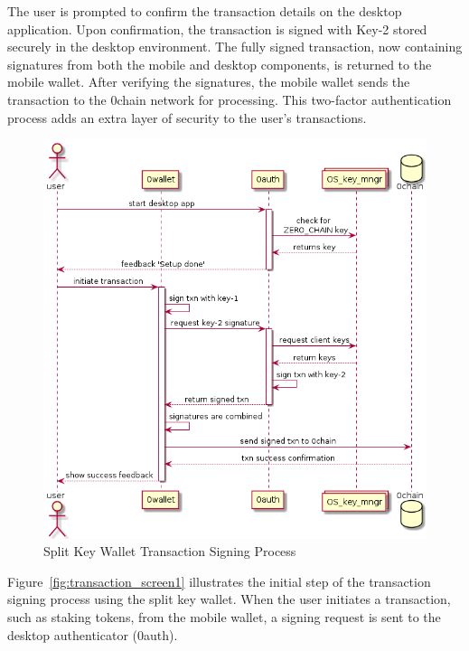 The user is prompted to confirm the transaction details on the desktop application. Upon confirmation, the transaction is signed with Key-2 stored securely in the desktop environment. The fully signed transaction, now containing signatures from both the mobile and desktop components, is returned to the mobile wallet. After verifying the signatures, the mobile wallet sends the transaction to the 0chain network for processing. This two-factor authentication process adds an extra layer of security to the user's transactions.

\begin{figure}[h]
    \centering
    \includegraphics[width=\textwidth]{Images/transaction_diagram.png}
    \caption{Split Key Wallet Transaction Signing Process}
    \label{fig:transaction}
\end{figure}

Figure~\ref{fig:transaction_screen1} illustrates the initial step of the transaction signing process using the split key wallet. When the user initiates a transaction, such as staking tokens, from the mobile wallet, a signing request is sent to the desktop authenticator (0auth).

